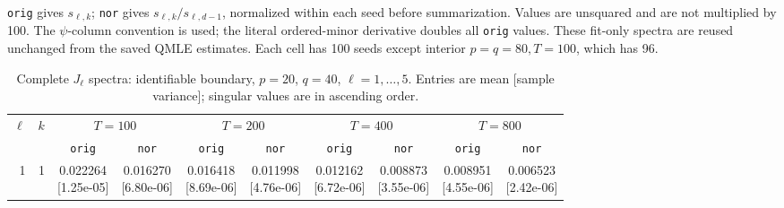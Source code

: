 \documentclass[12pt,letterpaper]{article}
\def\spacingset#1{\renewcommand{\baselinestretch}{#1}\small\normalsize}
\theoremstyle{plain}
\theoremstyle{definition}
\begin{document}
\begin{table}[p]
\begin{adjustbox}{max width=\linewidth}
\begin{tabular}{@{}rr*{8}{c}@{}}
\bottomrule
\end{tabular}
\end{adjustbox}
\par\smallskip
\begin{minipage}{0.98\linewidth}\footnotesize
\texttt{orig} gives $s_{\ell,k}$; \texttt{nor} gives $s_{\ell,k}/s_{\ell,d-1}$, normalized within each seed before summarization. Values are unsquared and are not multiplied by 100. The $\psi$-column convention is used; the literal ordered-minor derivative doubles all \texttt{orig} values. These fit-only spectra are reused unchanged from the saved QMLE estimates. Each cell has 100 seeds except interior $p=q=80,T=100$, which has 96.
\end{minipage}
\endgroup
\end{table}
\clearpage
\begin{table}[p]
\begingroup
\spacingset{1.0}
\small\centering
\caption{Complete $J_\ell$ spectra: identifiable boundary, $p=20$, $q=40$, $\ell=1,\ldots,5$. Entries are mean [sample variance]; singular values are in ascending order.}
\label{s23:lambda:alltab:spectra:p20q40boundary:1-5}
\footnotesize
\setlength{\tabcolsep}{2.2pt}
\renewcommand{\arraystretch}{1.03}
\begin{adjustbox}{max width=\linewidth}
\begin{tabular}{@{}rr*{8}{c}@{}}
\toprule
$\ell$ & $k$ & \multicolumn{2}{c}{$T=100$} & \multicolumn{2}{c}{$T=200$} & \multicolumn{2}{c}{$T=400$} & \multicolumn{2}{c}{$T=800$}\\
\cmidrule(lr){3-4}\cmidrule(lr){5-6}\cmidrule(lr){7-8}\cmidrule(lr){9-10}
 &  & \texttt{orig} & \texttt{nor} & \texttt{orig} & \texttt{nor} & \texttt{orig} & \texttt{nor} & \texttt{orig} & \texttt{nor}\\
\midrule
1 & 1 & \shortstack{0.022264\\[-1pt]{\scriptsize[1.25e-05]}} & \shortstack{0.016270\\[-1pt]{\scriptsize[6.80e-06]}} & \shortstack{0.016418\\[-1pt]{\scriptsize[8.69e-06]}} & \shortstack{0.011998\\[-1pt]{\scriptsize[4.76e-06]}} & \shortstack{0.012162\\[-1pt]{\scriptsize[6.72e-06]}} & \shortstack{0.008873\\[-1pt]{\scriptsize[3.55e-06]}} & \shortstack{0.008951\\[-1pt]{\scriptsize[4.55e-06]}} & \shortstack{0.006523\\[-1pt]{\scriptsize[2.42e-06]}}\\

\end{tabular}
\end{adjustbox}
\end{table}
\end{document}
